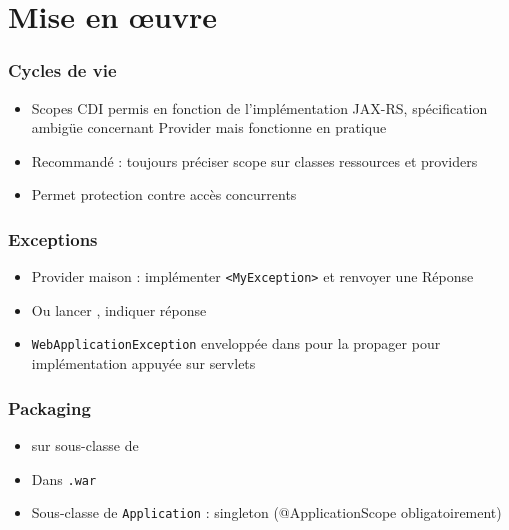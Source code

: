 \documentclass[english, french]{beamer}
\begin{document}
\section{Mise en œuvre}
\begin{frame}
	\frametitle{Cycles de vie}
	\begin{itemize}
		\item Scopes CDI permis {\tiny en fonction de l’implémentation JAX-RS,} {\tiny spécification ambigüe concernant Provider mais fonctionne en pratique}
		\item Recommandé : toujours préciser scope sur classes ressources et providers
		\item Permet protection contre accès concurrents
	\end{itemize}
\end{frame}

\begin{frame}
	\frametitle{Exceptions}
	\begin{itemize}
		\item Provider maison : implémenter \texttt{<MyException>} et renvoyer une Réponse
		\item Ou lancer , indiquer réponse
		\item \texttt{WebApplicationException} enveloppée dans  pour la propager {\tiny pour implémentation appuyée sur servlets}
	\end{itemize}
\end{frame}

\begin{frame}
	\frametitle{Packaging}
	\begin{itemize}
		\item {} sur sous-classe de 
		\item Dans \texttt{.war}
		\item Sous-classe de \texttt{Application} : singleton {\tiny (@ApplicationScope obligatoirement)}
	\end{itemize}
\end{frame}
\end{document}

